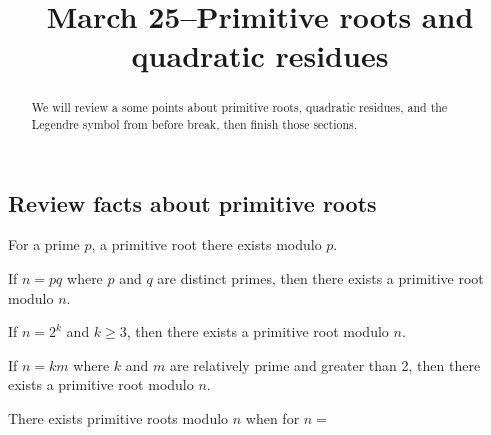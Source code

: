 \documentclass{ximera}
\title{March 25--Primitive roots and quadratic residues}
\theoremstyle{plain}
\begin{document}
  
\begin{abstract}  
We will review a some points about primitive roots, quadratic residues, and the Legendre symbol from before break, then finish those sections.
\end{abstract}  
\maketitle  

\subsection{Review facts about primitive roots}
\begin{question}
For a prime $p$, a primitive root there exists modulo $p$.
\begin{multipleChoice}
\end{multipleChoice}
\end{question}

\begin{question}
 If $n=pq$ where $p$ and $q$ are distinct primes, then there exists a primitive root modulo $n$.
 \begin{multipleChoice}
\end{multipleChoice}
\end{question}

\begin{question}
 If $n=2^k$ and $k\geq 3$, then there exists a primitive root modulo $n$.
 \begin{multipleChoice}
\end{multipleChoice}
\end{question}

\begin{question}
 If $n=km$ where $k$ and $m$ are relatively prime and greater than 2, then there exists a primitive root modulo $n$.
 \begin{multipleChoice}
\end{multipleChoice}
\end{question}

\begin{question}
There exists primitive roots modulo $n$ when for $n=$
 \begin{selectAll}
\end{selectAll}
\end{question}
\end{document}
